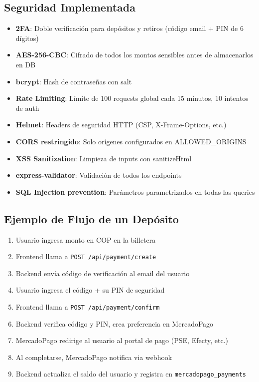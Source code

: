 \documentclass[12pt,oneside]{article}
\begin{document}
\subsection{Seguridad Implementada}

\begin{itemize}
    \item \textbf{2FA}: Doble verificación para depósitos y retiros (código email + PIN de 6 dígitos)
    \item \textbf{AES-256-CBC}: Cifrado de todos los montos sensibles antes de almacenarlos en DB
    \item \textbf{bcrypt}: Hash de contraseñas con salt
    \item \textbf{Rate Limiting}: Límite de 100 requests global cada 15 minutos, 10 intentos de auth
    \item \textbf{Helmet}: Headers de seguridad HTTP (CSP, X-Frame-Options, etc.)
    \item \textbf{CORS restringido}: Solo orígenes configurados en ALLOWED\_ORIGINS
    \item \textbf{XSS Sanitization}: Limpieza de inputs con sanitizeHtml
    \item \textbf{express-validator}: Validación de todos los endpoints
    \item \textbf{SQL Injection prevention}: Parámetros parametrizados en todas las queries
\end{itemize}

\subsection{Ejemplo de Flujo de un Depósito}

\begin{enumerate}
    \item Usuario ingresa monto en COP en la billetera
    \item Frontend llama a \texttt{POST /api/payment/create}
    \item Backend envía código de verificación al email del usuario
    \item Usuario ingresa el código + su PIN de seguridad
    \item Frontend llama a \texttt{POST /api/payment/confirm}
    \item Backend verifica código y PIN, crea preferencia en MercadoPago
    \item MercadoPago redirige al usuario al portal de pago (PSE, Efecty, etc.)
    \item Al completarse, MercadoPago notifica via webhook
    \item Backend actualiza el saldo del usuario y registra en \texttt{mercadopago\_payments}
\end{enumerate}
\end{document}
